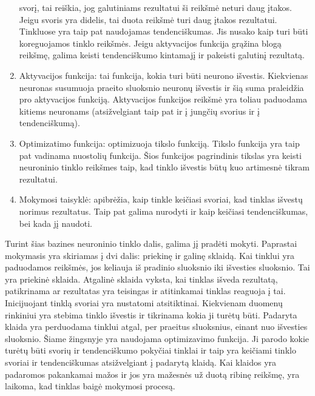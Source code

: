 \documentclass{VUMIFInfKursinis}
\begin{document}
\begin{enumerate}
  svorį, tai reiškia, jog galutiniams rezultatui ši reikšmė neturi daug įtakos. Jeigu svoris yra
  didelis, tai duota reikšmė turi daug įtakos rezultatui. \cite{salt2} Tinkluose yra
  taip pat naudojamas tendenciškumas. Jis nusako kaip turi būti koreguojamos tinklo reikšmės.
  Jeigu aktyvacijos funkcija grąžina blogą reikšmę, galima keisti tendenciškumo kintamajį ir
  pakeisti galutinį rezultatą.
  \item Aktyvacijos funkcija: tai funkcija, kokia turi būti neurono išvestis. Kiekvienas neuronas
  susumuoja praeito sluoksnio neuronų išvestis ir šią suma praleidžia pro aktyvacijos funkciją.
  Aktyvacijos funkcijos reikšmė yra toliau paduodama kitiems neuronams (atsižvelgiant taip pat ir į
  jungčių svorius ir į tendenciškumą).
  \item Optimizatimo funkcija: optimizuoja tikslo funkciją. Tikslo funkcija yra taip pat vadinama nuostolių funkcija.
  Šios funkcijos pagrindinis tikslas yra keisti neuroninio tinklo reikšmes taip, kad tinklo išvestis būtų
  kuo artimesnė tikram rezultatui.
  \item Mokymosi taisyklė: apibrėžia, kaip tinkle keičiasi svoriai, kad tinklas išvestų norimus rezultatus.
  Taip pat galima nurodyti ir kaip keičiasi tendenciškumas, bei kada jį naudoti.
\end{enumerate}
\par
Turint šias bazines neuroninio tinklo dalis, galima jį pradėti mokyti. Paprastai mokymasis
yra skiriamas į dvi dalis: priekinę ir galinę sklaidą.
Kai tinklui yra paduodamos reikšmės, jos keliauja iš pradinio sluoksnio iki išvesties sluoksnio. Tai
yra priekinė sklaida.
Atgalinė sklaida vyksta, kai tinklas išveda rezultatą, patikrinama ar
rezultatas yra teisingas ir atitinkamai tinklas reaguoja į tai. Inicijuojant tinklą svoriai yra
nustatomi atsitiktinai. Kiekvienam duomenų rinkiniui yra stebima tinklo išvestis ir tikrinama kokia
ji turėtų būti. Padaryta klaida yra perduodama tinklui atgal, per praeitus sluoksnius, einant nuo
išvesties sluoksnio. Šiame žingsnyje yra naudojama optimizavimo funkcija. Ji parodo kokie turėtų būti
svorių ir tendenciškumo pokyčiai tinklai ir taip yra
keičiami tinklo svoriai ir tendenciškumas atsižvelgiant į padarytą klaidą. Kai klaidos
yra padaromos pakankamai mažos ir jos yra mažesnės už duotą ribinę reikšmę, yra laikoma, kad tinklas
baigė mokymosi procesą. \cite{salt3}
\end{document}
